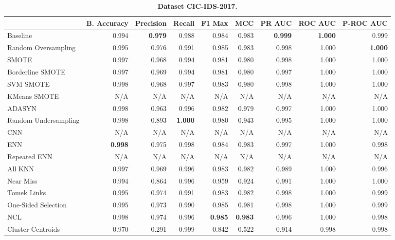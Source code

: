 \begin{table}[H]
    \centering
    \setlength\tabcolsep{2pt}
    \begin{tabularx}{\textwidth}{lRRRRRRRR}
        & B. Accuracy & Precision & Recall & F1 Max & MCC & PR AUC & ROC AUC & P-ROC AUC \\
        \midrule
        Baseline & 0.994 & \textbf{0.979} & 0.988 & 0.984 & 0.983 & \textbf{0.999} & \textbf{1.000} & 0.999 \\
        Random Oversampling & 0.995 & 0.976 & 0.991 & 0.985 & 0.983 & 0.998 & 1.000 & \textbf{1.000} \\
        SMOTE & 0.997 & 0.968 & 0.994 & 0.981 & 0.980 & 0.998 & 1.000 & 1.000 \\
        Borderline SMOTE & 0.997 & 0.969 & 0.994 & 0.981 & 0.980 & 0.997 & 1.000 & 1.000 \\
        SVM SMOTE & 0.998 & 0.968 & 0.997 & 0.983 & 0.980 & 0.998 & 1.000 & 1.000 \\
        KMeans SMOTE & N/A & N/A & N/A & N/A & N/A & N/A & N/A & N/A \\
        ADASYN & 0.998 & 0.963 & 0.996 & 0.982 & 0.979 & 0.997 & 1.000 & 1.000 \\
        Random Undersampling & 0.998 & 0.893 & \textbf{1.000} & 0.980 & 0.943 & 0.995 & 1.000 & 1.000 \\
        CNN & N/A & N/A & N/A & N/A & N/A & N/A & N/A & N/A \\
        ENN & \textbf{0.998} & 0.975 & 0.998 & 0.984 & 0.983 & 0.997 & 1.000 & 0.998 \\
        Repeated ENN & N/A & N/A & N/A & N/A & N/A & N/A & N/A & N/A \\
        All KNN & 0.997 & 0.969 & 0.996 & 0.983 & 0.982 & 0.989 & 1.000 & 0.996 \\
        Near Miss & 0.994 & 0.864 & 0.996 & 0.959 & 0.924 & 0.991 & 1.000 & 1.000 \\
        Tomek Links & 0.995 & 0.974 & 0.991 & 0.983 & 0.982 & 0.998 & 1.000 & 0.999 \\
        One-Sided Selection & 0.995 & 0.973 & 0.990 & 0.985 & 0.981 & 0.998 & 1.000 & 0.999 \\
        NCL & 0.998 & 0.974 & 0.996 & \textbf{0.985} & \textbf{0.983} & 0.996 & 1.000 & 0.998 \\
        Cluster Centroids & 0.970 & 0.291 & 0.999 & 0.842 & 0.522 & 0.914 & 0.998 & 0.998 \\
    \end{tabularx}
    \vspace{1mm}
    \caption{\textbf{Dataset CIC-IDS-2017.}}
\end{table}
